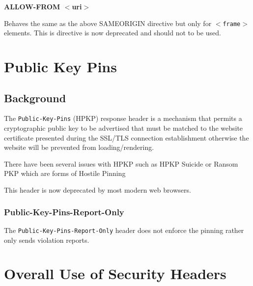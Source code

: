 \documentclass{mscreport}
\begin{document}
\vspace{0.7cm} \noindent
\textbf{ALLOW-FROM $<$uri$>$}

\vspace{0.3cm} \noindent
Behaves the same as the above SAMEORIGIN directive but only for \texttt{$<$frame$>$} elements. This is directive is now deprecated and should not to be used.

\newpage


\section{Public Key Pins}
\label{section:hpkp}

\subsection{Background}

The \texttt{Public-Key-Pins} (HPKP) response header is a mechanism that permits a cryptographic public key to be advertised that must be matched to the website certificate presented during the SSL/TLS connection establishment otherwise the website will be prevented from loading/rendering.

\vspace{0.3cm} \noindent
There have been several issues with HPKP such as HPKP Suicide \cite{Chen2018-ft,Chuat2021-nf} or Ransom PKP \cite{Chuat2021-nf} which are forms of Hostile Pinning \cite{Evans2018-mi}

\vspace{0.3cm} \noindent
This header is now deprecated by most modern web browsers.

\subsubsection{Public-Key-Pins-Report-Only}
The \texttt{Public-Key-Pins-Report-Only} header does not enforce the pinning rather only sends violation reports.

\clearpage
\newpage


\section{Overall Use of Security Headers}



\newpage





\end{document}
